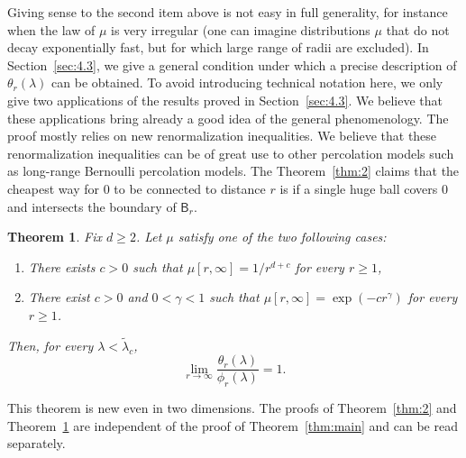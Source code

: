 \documentclass[10pt]{amsart}
\newtheorem{theo}{Theorem}[section]
\theoremstyle{definition}\newtheorem{defi}[theo]{Definition}\newtheorem{rema}[theo]{Remark}\newtheorem{exam}[theo]{Example}\newtheorem{exem}[theo]{Example}\newtheorem{nota}[theo]{Notation}
\newcommand*{\cenumi}{\renewcommand*{\theenumi}{C\arabic{enumi}}}
\begin{document}
Giving sense to the second item above is not easy in full generality, for instance when the law of $\mu$ is very irregular (one can imagine distributions $\mu$ that do not decay exponentially fast, but for which large range of radii are excluded). In Section~\ref{sec:4.3}, we give a general condition under which a precise description of $\theta_r(\lambda)$ can be obtained. To avoid introducing technical notation here, we only give two applications of the results proved in Section~\ref{sec:4.3}. We believe that these applications bring already a good idea of the general phenomenology. The proof mostly relies on new renormalization inequalities. We believe that these renormalization inequalities can be of great use to other percolation models such as long-range Bernoulli percolation models. The Theorem~\ref{thm:2} claims that the cheapest way for 0 to be connected to distance $r$ is if a single huge ball covers 0 and intersects the boundary of $\mathsf B_r$.


\begin{theo}\label{thm:3}
Fix $d\ge2$. Let $\mu$ satisfy one of the two following cases:
\begin{enumerate}\cenumi
\item\label{C1}
There exists $c>0$ such that $\mu[r,\infty]=1/r^{d+c}$ for every $r\ge 1$,
\item\label{C2}
There exist $c>0$ and $0<\gamma<1$ such that $\mu[r,\infty]=\exp(-cr^{\gamma})$ for every $r\ge1$.
\end{enumerate}
Then, for every $\lambda<\widetilde\lambda_c$,
\[
\lim_{r\rightarrow\infty}\frac{\theta_r(\lambda)}{\phi_r(\lambda)}=1.
\]
\end{theo}


This theorem is new even in two dimensions. The proofs of Theorem~\ref{thm:2} and Theorem~\ref{thm:3} are independent of the proof of Theorem~\ref{thm:main} and can be read separately.
\end{document}
